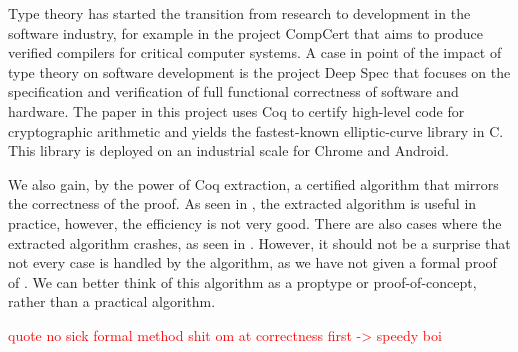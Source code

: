 Type theory has started the transition from research to development in
the software industry, for example in the project CompCert \cite{compcert} that aims to
produce verified compilers for critical computer systems.
A case in point of the impact of type theory on software development is the project Deep Spec
\cite{deepspec} that focuses on the specification and verification of full functional
correctness of software and hardware. The paper \cite{secpriv} in this project uses Coq to certify high-level
code for cryptographic arithmetic and yields the fastest-known elliptic-curve library in C.
This library is deployed on an industrial scale for Chrome and Android.

We also gain, by the power of Coq extraction, a certified algorithm that mirrors the correctness of the proof.
As seen in , the extracted algorithm is useful in practice,
however, the efficiency is not very good.
There are also cases where the extracted algorithm crashes, as seen in .
However, it should not be a surprise that not every case is handled by the algorithm,
as we have not given a formal proof of .
We can better think of this algorithm as a proptype or proof-of-concept,
rather than a practical algorithm.

\textcolor{red}{quote no sick formal method shit om at correctness first -> speedy boi}
